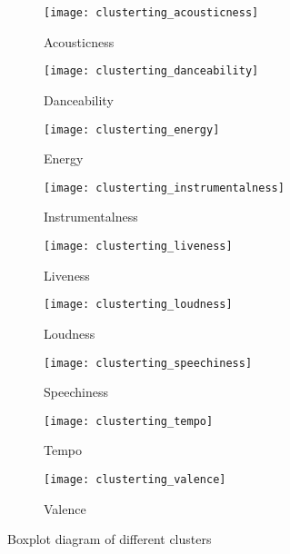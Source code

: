 \begin{figure}
  \begin{subfigure}[b]{0.3\textwidth}
    \texttt{[image: clusterting\_acousticness]}
    \caption{Acousticness}
    \label{fig:clusterting_acousticness}
  \end{subfigure}
  \hfill
  \begin{subfigure}[b]{0.3\textwidth}
    \texttt{[image: clusterting\_danceability]}
    \caption{Danceability}
    \label{fig:clusterting_danceability}
  \end{subfigure}
  \hfill
  \begin{subfigure}[b]{0.3\textwidth}
    \texttt{[image: clusterting\_energy]}
    \caption{Energy}
    \label{fig:clusterting_energy}
  \end{subfigure}
  
  \bigskip
    \begin{subfigure}[b]{0.3\textwidth}
    \texttt{[image: clusterting\_instrumentalness]}
    \caption{Instrumentalness}
    \label{fig:clusterting_instrumentalness}
  \end{subfigure}
  \hfill
    \begin{subfigure}[b]{0.3\textwidth}
    \texttt{[image: clusterting\_liveness]}
    \caption{Liveness}
    \label{fig:clusterting_liveness}
  \end{subfigure}
  \hfill
    \begin{subfigure}[b]{0.3\textwidth}
    \texttt{[image: clusterting\_loudness]}
    \caption{Loudness}
    \label{fig:clusterting_loudness}
  \end{subfigure}
  
  \bigskip
      \begin{subfigure}[b]{0.3\textwidth}
    \texttt{[image: clusterting\_speechiness]}
    \caption{Speechiness}
    \label{fig:clusterting_speechiness}
  \end{subfigure}
  \hfill
    \begin{subfigure}[b]{0.3\textwidth}
    \texttt{[image: clusterting\_tempo]}
    \caption{Tempo}
    \label{fig:clusterting_tempo}
  \end{subfigure}
  \hfill
    \begin{subfigure}[b]{0.3\textwidth}
    \texttt{[image: clusterting\_valence]}
    \caption{Valence}
    \label{fig:clusterting_valence}
  \end{subfigure}
  
  \caption{Boxplot diagram of different clusters}
  \label{fig:boxplot_cluster}
\end{figure}

